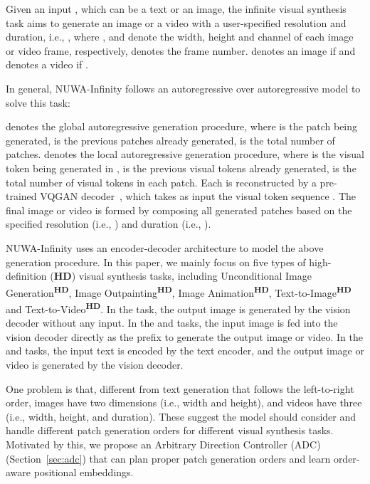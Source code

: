 \documentclass{article}
\begin{document}
Given an input , which can be a text or an image, the infinite visual synthesis task aims to generate an image or a video  with a user-specified resolution and duration, i.e., , where ,  and  denote the width, height and channel of each image or video frame, respectively,  denotes the frame number.  denotes an image if  and denotes a video if . 

In general, NUWA-Infinity follows an autoregressive over autoregressive model to solve this task:

 denotes the global autoregressive generation procedure, where  is the  patch being generated,  is the previous  patches already generated,  is the total number of patches.  denotes the local autoregressive generation procedure, where  is the  visual token being generated in ,  is the previous  visual tokens already generated,  is the total number of visual tokens in each patch. Each  is reconstructed by a pre-trained VQGAN decoder~\cite{esserTamingTransformersHighResolution2021}, which takes as input the visual token sequence . The final image or video is formed by composing all generated patches  based on the specified resolution (i.e., ) and duration (i.e., ).

NUWA-Infinity uses an encoder-decoder architecture to model the above generation procedure. In this paper, we mainly focus on five types of high-definition (\textbf{HD}) visual synthesis tasks, including Unconditional Image Generation\textsuperscript{\textbf{HD}}, Image Outpainting\textsuperscript{\textbf{HD}}, Image Animation\textsuperscript{\textbf{HD}}, Text-to-Image\textsuperscript{\textbf{HD}} and Text-to-Video\textsuperscript{\textbf{HD}}. In the  task, the output image is generated by the vision decoder without any input. In the  and  tasks, the input image is fed into the vision decoder directly as the prefix to generate the output image or video. In the  and  tasks, the input text is encoded by the text encoder, and the output image or video is generated by the vision decoder.

One problem is that, different from text generation that follows the left-to-right order, images have two dimensions (i.e., width and height), and videos have three (i.e., width, height, and duration). These suggest the model should consider and handle different patch generation orders for different visual synthesis tasks. Motivated by this, we propose an Arbitrary Direction Controller (ADC) (Section~\ref{sec:adc}) that can plan proper patch generation orders and learn order-aware positional embeddings.
\end{document}
